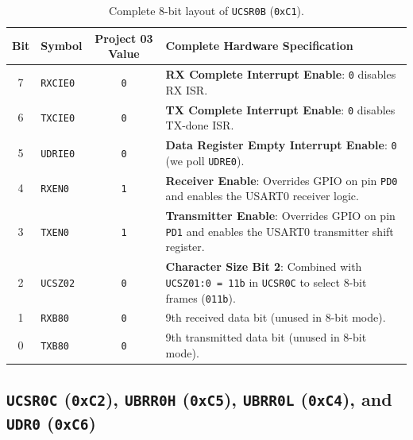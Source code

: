 \documentclass[11pt,a4paper,oneside]{report}
\begin{document}
\begin{table}[!htbp]
\centering
\caption{Complete 8-bit layout of \texttt{UCSR0B} (\texttt{0xC1}).}
\label{tab:ch3_ucsr0b}
\begin{tabularx}{\linewidth}{c l c X}
\toprule
\textbf{Bit} & \textbf{Symbol} & \textbf{Project 03 Value} & \textbf{Complete Hardware Specification} \\
\midrule
7 & \texttt{RXCIE0} & \texttt{0} & \textbf{RX Complete Interrupt Enable}: \texttt{0} disables RX ISR. \\
6 & \texttt{TXCIE0} & \texttt{0} & \textbf{TX Complete Interrupt Enable}: \texttt{0} disables TX-done ISR. \\
5 & \texttt{UDRIE0} & \texttt{0} & \textbf{Data Register Empty Interrupt Enable}: \texttt{0} (we poll \texttt{UDRE0}). \\
4 & \texttt{RXEN0} & \texttt{1} & \textbf{Receiver Enable}: Overrides GPIO on pin \texttt{PD0} and enables the USART0 receiver logic. \\
3 & \texttt{TXEN0} & \texttt{1} & \textbf{Transmitter Enable}: Overrides GPIO on pin \texttt{PD1} and enables the USART0 transmitter shift register. \\
2 & \texttt{UCSZ02} & \texttt{0} & \textbf{Character Size Bit 2}: Combined with \texttt{UCSZ01:0 = 11b} in \texttt{UCSR0C} to select 8-bit frames (\texttt{011b}). \\
1 & \texttt{RXB80} & \texttt{0} & 9th received data bit (unused in 8-bit mode). \\
0 & \texttt{TXB80} & \texttt{0} & 9th transmitted data bit (unused in 8-bit mode). \\
\bottomrule
\end{tabularx}
\end{table}

\subsection{\texttt{UCSR0C} (\texttt{0xC2}), \texttt{UBRR0H} (\texttt{0xC5}), \texttt{UBRR0L} (\texttt{0xC4}), and \texttt{UDR0} (\texttt{0xC6})}
\end{document}
